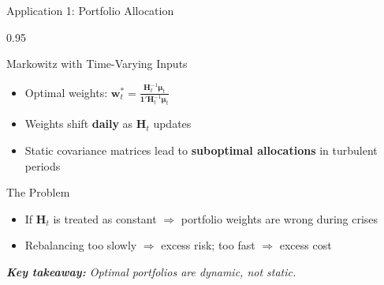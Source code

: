 \documentclass[9pt, aspectratio=169, t]{beamer}
\begin{document}
\begin{frame}{Application 1: Portfolio Allocation}
    \begin{cminipage}{0.95\textwidth}
    {\footnotesize
    \begin{block}{Markowitz with Time-Varying Inputs}
        \begin{itemize}\setlength{\itemsep}{2pt}
            \item Optimal weights: $\mathbf{w}_t^{*} = \frac{\mathbf{H}_t^{-1} \boldsymbol{\mu}_t}{\mathbf{1}' \mathbf{H}_t^{-1} \boldsymbol{\mu}_t}$
            \item Weights shift \textbf{daily} as $\mathbf{H}_t$ updates
            \item Static covariance matrices lead to \textbf{suboptimal allocations} in turbulent periods
        \end{itemize}
    \end{block}
    \vspace{0.1cm}
    \begin{alertblock}{The Problem}
        \begin{itemize}\setlength{\itemsep}{0pt}
            \item If $\mathbf{H}_t$ is treated as constant $\Rightarrow$ portfolio weights are wrong during crises
            \item Rebalancing too slowly $\Rightarrow$ excess risk; too fast $\Rightarrow$ excess cost
        \end{itemize}
    \end{alertblock}
    \vspace{0.2cm}
    \textit{\textbf{Key takeaway:} Optimal portfolios are dynamic, not static.}
    }
    \end{cminipage}
\end{frame}
\end{document}
